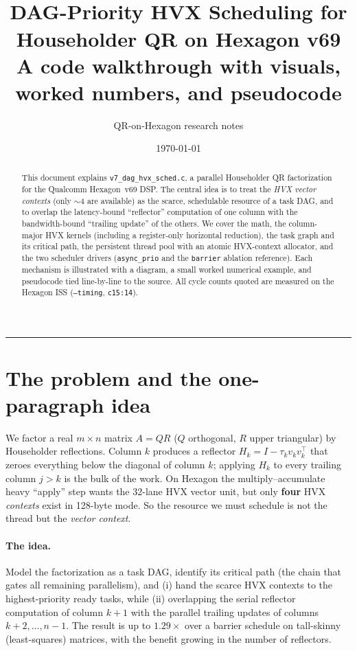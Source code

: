 \documentclass[11pt]{article}
\title{\textbf{\code{v7\_dag\_hvx\_sched}}\\[4pt]
\large DAG-Priority HVX Scheduling for Householder QR on Hexagon v69\\[2pt]
\normalsize A code walkthrough with visuals, worked numbers, and pseudocode}
\author{QR-on-Hexagon research notes}
\date{\today}
\newcommand{\code}[1]{\texttt{\small #1}}
\newcommand{\file}[1]{\textcolor{hvxblue}{\texttt{#1}}}
\begin{document}
\maketitle

\begin{abstract}
\noindent
This document explains \file{v7\_dag\_hvx\_sched.c}, a parallel Householder QR
factorization for the Qualcomm Hexagon~v69 DSP. The central idea is to treat the
\emph{HVX vector contexts} (only $\sim$4 are available) as the scarce, schedulable
resource of a task DAG, and to overlap the latency-bound ``reflector'' computation of
one column with the bandwidth-bound ``trailing update'' of the others. We cover the
math, the column-major HVX kernels (including a register-only horizontal reduction),
the task graph and its critical path, the persistent thread pool with an atomic
HVX-context allocator, and the two scheduler drivers (\code{async\_prio} and the
\code{barrier} ablation reference). Each mechanism is illustrated with a diagram, a
small worked numerical example, and pseudocode tied line-by-line to the source.
All cycle counts quoted are measured on the Hexagon ISS (\code{--timing}, \code{c15:14}).
\end{abstract}

\tableofcontents
\bigskip\hrule

\section{The problem and the one-paragraph idea}
We factor a real $m\times n$ matrix $A=QR$ ($Q$ orthogonal, $R$ upper triangular) by
Householder reflections. Column $k$ produces a reflector $H_k=I-\tau_k v_k v_k^{\!\top}$
that zeroes everything below the diagonal of column $k$; applying $H_k$ to every
trailing column $j>k$ is the bulk of the work. On Hexagon the multiply--accumulate
heavy ``apply'' step wants the 32-lane HVX vector unit, but only \textbf{four} HVX
\emph{contexts} exist in 128-byte mode. So the resource we must schedule is not the
thread but the \emph{vector context}.

\paragraph{The idea.} Model the factorization as a task DAG, identify its critical
path (the chain that gates all remaining parallelism), and (i) hand the scarce HVX
contexts to the highest-priority ready tasks, while (ii) overlapping the serial
reflector computation of column $k{+}1$ with the parallel trailing updates of columns
$k{+}2,\dots,n{-}1$. The result is up to $1.29\times$ over a barrier schedule on
tall-skinny (least-squares) matrices, with the benefit growing in the number of
reflectors.
\end{document}
